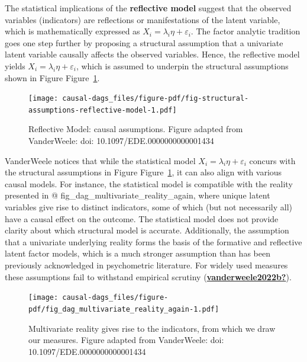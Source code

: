 \documentclass[
  singlecolumn]{report}
\begin{document}
The statistical implications of the \textbf{reflective model} suggest
that the observed variables (indicators) are reflections or
manifestations of the latent variable, which is mathematically expressed
as \(X_i = \lambda_i \eta + \varepsilon_i\). The factor analytic
tradition goes one step further by proposing a structural assumption
that a univariate latent variable causally affects the observed
variables. Hence, the reflective model yields
\(X_i = \lambda_i \eta + \varepsilon_i\), which is assumed to underpin
the structural assumptions shown in Figure
Figure~\ref{fig-structural-assumptions-reflective-model}.

\begin{figure}

{\centering \texttt{[image: causal-dags\_files/figure-pdf/fig-structural-assumptions-reflective-model-1.pdf]}

}

\caption{\label{fig-structural-assumptions-reflective-model}Reflective
Model: causal assumptions. Figure adapted from VanderWeele: doi:
10.1097/EDE.0000000000001434}

\end{figure}

VanderWeele notices that while the statistical model
\(X_i = \lambda_i \eta + \varepsilon_i\) concurs with the structural
assumptions in Figure
Figure~\ref{fig-structural-assumptions-reflective-model}, it can also
align with various causal models. For instance, the statistical model is
compatible with the reality presented in @
fig\_dag\_multivariate\_reality\_again, where unique latent variables
give rise to distinct indicators, some of which (but not necessarily
all) have a causal effect on the outcome. The statistical model does not
provide clarity about which structural model is accurate. Additionally,
the assumption that a univariate underlying reality forms the basis of
the formative and reflective latent factor models, which is a much
stronger assumption than has been previously acknowledged in
psychometric literature. For widely used measures these assumptions fail
to withstand empirical scrutiny
(\protect\hyperlink{ref-vanderweele2022b}{\textbf{vanderweele2022b?}}).

\begin{figure}

{\centering \texttt{[image: causal-dags\_files/figure-pdf/fig\_dag\_multivariate\_reality\_again-1.pdf]}

}

\caption{Multivariate reality gives rise to the indicators, from which
we draw our measures. Figure adapted from VanderWeele: doi:
10.1097/EDE.0000000000001434}

\end{figure}
\end{document}
